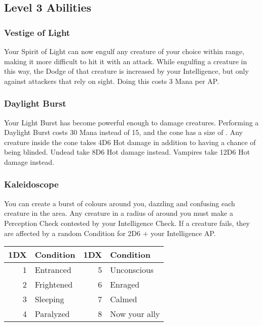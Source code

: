 \subsection{Level 3 Abilities}

\subsubsection{Vestige of Light}
Your Spirit of Light can now engulf any creature of your choice within range, making it more difficult to hit it with an attack.
While engulfing a creature in this way, the Dodge of that creature is increased by your Intelligence, but only against attackers that rely on sight.
Doing this costs 3 Mana per AP.

\subsubsection{Daylight Burst}
Your Light Burst has become powerful enough to damage creatures.
Performing a Daylight Burst costs 30 Mana instead of 15, and the cone has a size of .
Any creature inside the cone takes 4D6 Hot damage in addition to having a chance of being blinded.
Undead take 8D6 Hot damage instead.
Vampires take 12D6 Hot damage instead.

\subsubsection{Kaleidoscope}
You can create a burst of colours around you, dazzling and confusing each creature in the area.
Any creature in a radius of  around you must make a Perception Check contested by your Intelligence Check.
If a creature fails, they are affected by a random Condition for 2D6 + your Intelligence AP.\\

\begin{tabular}{r | l || r | l}
	1DX & Condition & 1DX & Condition\\
	\hline
	1 & Entranced & 5 & Unconscious \\
	2 & Frightened & 6 & Enraged \\
	3 & Sleeping & 7 & Calmed\\
	4 & Paralyzed & 8 & Now your ally \\
\end{tabular}